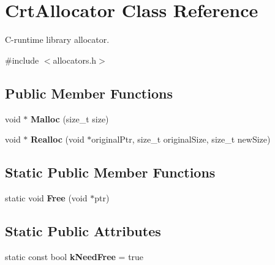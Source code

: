 \hypertarget{class_crt_allocator}{}\section{Crt\+Allocator Class Reference}
\label{class_crt_allocator}


C-\/runtime library allocator.  




{\ttfamily \#include $<$allocators.\+h$>$}

\subsection*{Public Member Functions}
\begin{DoxyCompactItemize}
\item 
void $\ast$ {\bfseries Malloc} (size\+\_\+t size)\hypertarget{class_crt_allocator_acd720631f8c094041afa6c7951f0d935}{}\label{class_crt_allocator_acd720631f8c094041afa6c7951f0d935}

\item 
void $\ast$ {\bfseries Realloc} (void $\ast$original\+Ptr, size\+\_\+t original\+Size, size\+\_\+t new\+Size)\hypertarget{class_crt_allocator_a646bb6f68afe773a62a22f7f14f83e97}{}\label{class_crt_allocator_a646bb6f68afe773a62a22f7f14f83e97}

\end{DoxyCompactItemize}
\subsection*{Static Public Member Functions}
\begin{DoxyCompactItemize}
\item 
static void {\bfseries Free} (void $\ast$ptr)\hypertarget{class_crt_allocator_a5043907058d906dcb1291e9491560373}{}\label{class_crt_allocator_a5043907058d906dcb1291e9491560373}

\end{DoxyCompactItemize}
\subsection*{Static Public Attributes}
\begin{DoxyCompactItemize}
\item 
static const bool {\bfseries k\+Need\+Free} = true\hypertarget{class_crt_allocator_ac7df8398c529290f0cd5950d9492f524}{}\label{class_crt_allocator_ac7df8398c529290f0cd5950d9492f524}

\end{DoxyCompactItemize}


